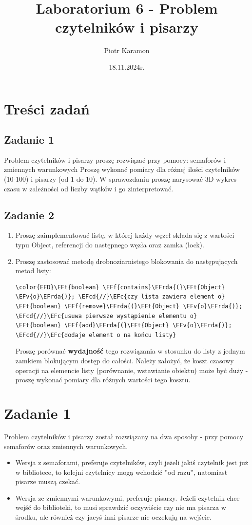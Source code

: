 \documentclass[11pt]{article}
\author{Piotr Karamon}
\date{18.11.2024r.}
\title{Laboratorium 6 - Problem czytelników i pisarzy}
\newcommand{\EFc}[1]{\textcolor{EFc}{\textit{#1}}} %
\newcommand{\EFcd}[1]{\textcolor{EFcd}{\textit{#1}}} %
\newcommand{\EFf}[1]{\textcolor{EFf}{#1}} %
\newcommand{\EFv}[1]{\textcolor{EFv}{#1}} %
\newcommand{\EFt}[1]{\textcolor{EFt}{#1}} %
\newcommand{\EFrda}[1]{#1} %
\begin{document}
\maketitle
\section*{Treści zadań}
\label{sec:orgbfe7cb5}
\subsection*{Zadanie 1}
\label{sec:org8260bf9}
Problem czytelników i pisarzy proszę rozwiązać przy pomocy: semaforów i zmiennych warunkowych
Proszę wykonać pomiary dla różnej ilości czytelników (10-100) i pisarzy (od 1 do 10).
W sprawozdaniu proszę narysować 3D wykres czasu w zależności od liczby wątków i go zinterpretować.
\subsection*{Zadanie 2}
\label{sec:org5cd22c8}

\begin{enumerate}
\item Proszę zaimplementować listę, w której każdy węzeł składa się z wartości typu Object, referencji do następnego węzła oraz zamka (lock).
\item Proszę zastosować metodę drobnoziarnistego blokowania do następujących metod listy:
\begin{Code}
\begin{Verbatim}
\color{EFD}\EFt{boolean} \EFf{contains}\EFrda{(}\EFt{Object} \EFv{o}\EFrda{)}; \EFcd{//}\EFc{czy lista zawiera element o}
\EFt{boolean} \EFf{remove}\EFrda{(}\EFt{Object} \EFv{o}\EFrda{)}; \EFcd{//}\EFc{usuwa pierwsze wystąpienie elementu o}
\EFt{boolean} \EFf{add}\EFrda{(}\EFt{Object} \EFv{o}\EFrda{)}; \EFcd{//}\EFc{dodaje element o na końcu listy}
\end{Verbatim}
\end{Code}

Proszę porównać \textbf{wydajność} tego rozwiązania w stosunku do listy z jednym zamkiem blokującym dostęp do całości. Należy założyć, że koszt czasowy operacji na elemencie listy (porównanie, wstawianie obiektu) może być duży - proszę wykonać pomiary dla różnych wartości tego kosztu.
\end{enumerate}
\section*{Zadanie 1}
\label{sec:org4405406}
Problem czytelników i pisarzy został rozwiązany na dwa sposoby - przy pomocy semaforów oraz zmiennych warunkowych.
\begin{itemize}
\item Wersja z semaforami, preferuje czytelników, czyli jeżeli jakiś czytelnik jest już w
bibliotece, to kolejni czytelnicy mogą wchodzić ''od razu'', natomiast pisarze muszą czekać.
\item Wersja ze zmiennymi warunkowymi, preferuje pisarzy. Jeżeli czytelnik chce wejść do biblioteki,
to musi sprawdzić oczywiście czy nie ma pisarza w środku, ale również czy jacyś inni pisarze
nie oczekują na wejście.
\end{itemize}
\end{document}
